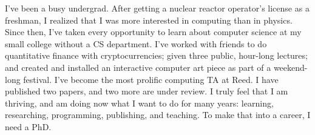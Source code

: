 I've been a busy undergrad. After getting a nuclear reactor operator's license as a freshman, I realized that I was more interested in computing than in physics. Since then, I've taken every opportunity to learn about computer science at my small college without a CS department. I've worked with friends to do quantitative finance with cryptocurrencies; given three public, hour-long lectures; and created and installed an interactive computer art piece as part of a weekend-long festival. I've become the most prolific computing TA at Reed. I have published two papers, and two more are under review. I truly feel that I am thriving, and am doing now what I want to do for many years: learning, researching, programming, publishing, and teaching. To make that into a career, I need a PhD. 



